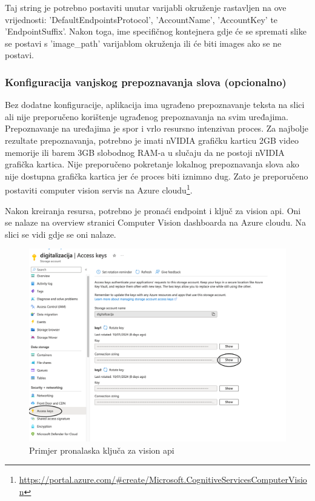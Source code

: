 			{Taj string je potrebno postaviti unutar varijabli okruženje rastavljen na ove vrijednosti: 'DefaultEndpointsProtocol', 'AccountName', 'AccountKey' te 'EndpointSuffix'. Nakon toga, ime specifičnog kontejnera gdje će se spremati slike se postavi s 'image\_path' varijablom okruženja ili će biti images ako se ne postavi.}
			
			\subsubsection{Konfiguracija vanjskog prepoznavanja slova (opcionalno)}
			
			{Bez dodatne konfiguracije, aplikacija ima ugrađeno prepoznavanje teksta na slici ali nije preporučeno korištenje ugrađenog prepoznavanja na svim uređajima. Prepoznavanje na uređajima je spor i vrlo resursno intenzivan proces. Za najbolje rezultate prepoznavanja, potrebno je imati nVIDIA grafičku karticu 2GB video memorije ili barem 3GB slobodnog RAM-a u slučaju da ne postoji nVIDIA grafička kartica. Nije preporučeno pokretanje lokalnog prepoznavanja slova ako nije dostupna grafička kartica jer će proces biti iznimno dug. Zato je preporučeno postaviti computer vision servis na Azure cloudu\footnote{\url{https://portal.azure.com/\#create/Microsoft.CognitiveServicesComputerVision}}.}
			
			{Nakon kreiranja resursa, potrebno je pronaći endpoint i ključ za vision api. Oni se nalaze na overview stranici Computer Vision dashboarda na Azure cloudu. Na slici se vidi gdje se oni nalaze.}
			
			\begin{figure}[H]
				\includegraphics[width=\textwidth]{slike/accessKey.png}
				\caption{Primjer pronalaska ključa za vision api}
				\label{fig:visionApiKey}
			\end{figure}
			
